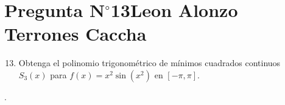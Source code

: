 \section{Pregunta N$^{\circ}$13\qquad Leon Alonzo Terrones Caccha}

\begin{frame}
    \begin{enumerate}\setcounter{enumi}{12}
        \item

              Obtenga el polinomio trigonométrico de mínimos
              cuadrados continuos $S_{3}\left(x\right)$ para
              \begin{math}
                  f\left(x\right)=
                  x^{2}\sin
                  \left(x^{2}\right)
              \end{math}
              en
              \begin{math}
                  \left[-\pi,\pi\right]
              \end{math}.
    \end{enumerate}

    \begin{solution}
        .
    \end{solution}
\end{frame}